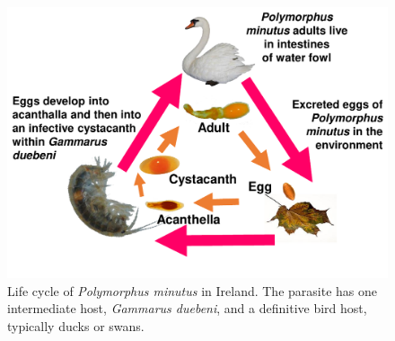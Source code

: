 
\begin{figure}[H] %
	  \centering
	  \includegraphics[keepaspectratio,width=\textwidth]{figures/ch1/pminutus_lifecycle.pdf}
	    \vspace*{-1.5cm}
	\caption[Life cycle of \emph{Polymorphus minutus} in Ireland] %
	    {Life cycle of \emph{Polymorphus minutus} in Ireland. The parasite has one intermediate host, \emph{Gammarus duebeni}, and a definitive bird host, typically ducks or swans.}%
	  \label{fig:lifecycle}
	\end{figure}
	


